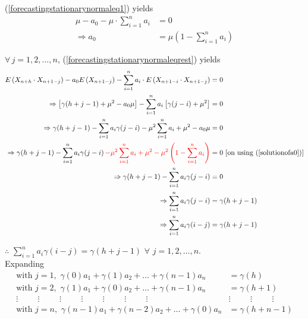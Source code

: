 \documentclass[11pt, a4paper]{article}
\numberwithin{equation}{section}
\theoremstyle{definition}
\begin{document}
(\ref{forecastingstationarynormaleq1}) yields
\begin{align}
\mu - a_0 - \mu \cdot \sum \limits_{i = 1}^{n} a_i &= 0 \nonumber \\[0.1em]
\Rightarrow a_0 &= \mu \left( 1 - \sum \limits_{i = 1}^{n} a_i \right) \label{solutionofa0}
\end{align}

$\forall \, j = 1, 2, \ldots, n$, (\ref{forecastingstationarynormaleqrest}) yields
\begin{align}
E\left( X_{n+h} \cdot X_{n+1-j} \right) - a_0 E\left( X_{n+1-j} \right) - \sum \limits_{i = 1}^{n} a_i \cdot E\left( X_{n+1-i} \cdot X_{n+1-j} \right) &= 0 \nonumber \\[0.1em]
\Rightarrow \left[ \gamma(h+j-1) + \mu^2 - a_0 \mu \right] - \sum \limits_{i = 1}^{n} a_i \left[ \gamma(j-i) + \mu^2 \right] &= 0 \nonumber \\[0.1em]
\Rightarrow \gamma(h+j-1) - \sum \limits_{i = 1}^{n} a_i \gamma(j-i) - \mu^2 \sum \limits_{i = 1}^{n} a_i + \mu^2 - a_0 \mu &= 0 \nonumber \\[0.1em]
\Rightarrow \gamma(h+j-1) - \sum \limits_{i = 1}^{n} a_i \gamma(j-i) \, \textcolor{red}{- \mu^2 \sum \limits_{i = 1}^{n} a_i + \mu^2 - \mu^2 \left( 1 - \sum \limits_{i = 1}^{n} a_i \right)} &= 0\,\, [\text{on using }(\ref{solutionofa0})] \nonumber \\[0.1em]
\Rightarrow \gamma(h+j-1) - \sum \limits_{i = 1}^{n} a_i \gamma(j-i) &= 0 \nonumber \\[0.1em]
\Rightarrow \sum \limits_{i = 1}^{n} a_i \gamma(j-i) &= \gamma(h+j-1) \nonumber \\[0.1em]
\Rightarrow \sum \limits_{i = 1}^{n} a_i \gamma(i-j) &= \gamma(h+j-1)
\end{align}

$\therefore$ $\sum \limits_{i = 1}^{n} a_i \gamma(i-j) = \gamma(h+j-1)$ $\forall \,\, j = 1, 2, \ldots, n$. \\[0.2em]

Expanding
\begin{align*}
\text{with }j = 1, \,\, \gamma(0)a_1 + \gamma(1)a_2 + \ldots + \gamma(n-1)a_n &= \gamma(h) \\[0.1em]
\text{with }j = 2, \,\, \gamma(1)a_1 + \gamma(0)a_2 + \ldots + \gamma(n-1)a_n &= \gamma(h+1) \\[0.1em]
\vdots \hspace{1cm} \vdots \hspace{1cm} \vdots \hspace{1cm} \vdots \hspace{1cm} \vdots \hspace{1cm} \vdots \hspace{1cm} \vdots \hspace{1cm} & \vdots \hspace{1cm} \vdots \hspace{1cm} \vdots \\[0.1em]
\text{with }j = n, \,\, \gamma(n-1)a_1 + \gamma(n-2)a_2 + \ldots + \gamma(0)a_n &= \gamma(h+n-1) \\[0.1em]
\end{align*}
\end{document}
